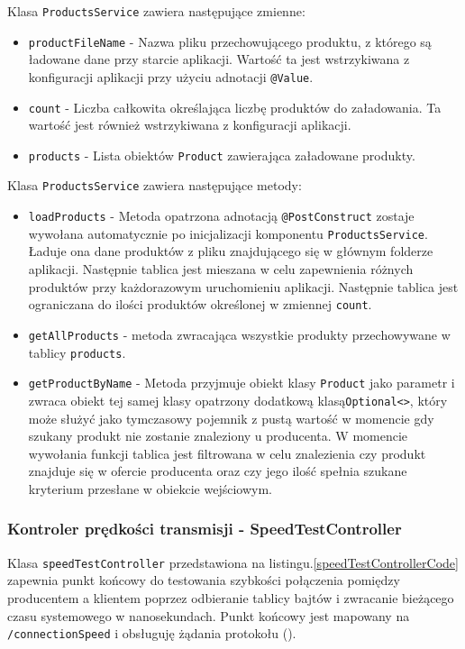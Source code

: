 Klasa \verb|ProductsService| zawiera następujące zmienne:
\begin{itemize}
    \item \verb|productFileName| - Nazwa pliku przechowującego produktu, z którego są ładowane dane przy starcie aplikacji. Wartość ta jest wstrzykiwana z konfiguracji aplikacji przy użyciu adnotacji \verb|@Value|.
    \item \verb|count| -  Liczba całkowita określająca liczbę produktów do załadowania. Ta wartość jest również wstrzykiwana z konfiguracji aplikacji.
    \item \verb|products| - Lista obiektów \verb|Product| zawierająca załadowane produkty.
\end{itemize}

Klasa \verb|ProductsService| zawiera następujące metody:
\begin{itemize}
    \item \verb|loadProducts| - Metoda opatrzona adnotacją \verb|@PostConstruct| zostaje wywołana automatycznie po inicjalizacji komponentu \verb|ProductsService|. Ładuje ona dane produktów z pliku znajdującego się w głównym folderze aplikacji. Następnie tablica jest mieszana w celu zapewnienia różnych produktów przy każdorazowym uruchomieniu aplikacji. Następnie tablica jest ograniczana do ilości produktów określonej w zmiennej \verb|count|.
    \item \verb|getAllProducts| - metoda zwracająca wszystkie produkty przechowywane w tablicy \verb|products|.
    \item \verb|getProductByName| - Metoda przyjmuje obiekt klasy \verb|Product| jako parametr i zwraca obiekt tej samej klasy opatrzony dodatkową klasą\verb|Optional<>|, który może służyć jako tymczasowy pojemnik z pustą wartość w momencie gdy szukany produkt nie zostanie znaleziony u producenta. W momencie wywołania funkcji tablica jest filtrowana w celu znalezienia czy produkt znajduje się w ofercie producenta oraz czy jego ilość spełnia szukane kryterium przesłane w obiekcie wejściowym.
\end{itemize}

\subsubsection{Kontroler prędkości transmisji - SpeedTestController}

Klasa \verb|speedTestController| przedstawiona na listingu.\ref{speedTestControllerCode} zapewnia punkt końcowy do testowania szybkości połączenia pomiędzy producentem a klientem poprzez odbieranie tablicy bajtów i zwracanie bieżącego czasu systemowego w nanosekundach. Punkt końcowy jest mapowany na \verb|/connectionSpeed| i obsługuję żądania  protokołu  ().

